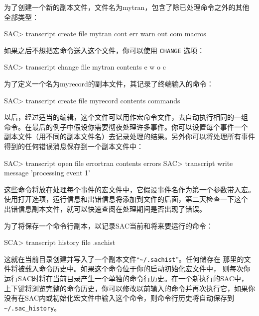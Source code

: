 为了创建一个新的副本文件，文件名为mytran，包含了除已处理命令之外的其他
全部类型：
\begin{SACCode}
SAC> transcript create file mytran cont err warn out com macros
\end{SACCode}

如果之后不想把宏命令送入这个文件，你可以使用 \texttt{CHANGE} 选项：
\begin{SACCode}
SAC> transcript change file mytran contents e w o c
\end{SACCode}

为了定义一个名为myrecord的副本文件，其记录了终端输入的命令：
\begin{SACCode}
SAC> transcript create file myrecord contents commands
\end{SACCode}

以后，经过适当的编辑，这个文件可以用作宏命令文件，去自动执行相同的一组
命令。在最后的例子中假设你需要彻夜处理许多事件。你可以设置每个事件一个
副本文件（用不同的副本文件名）去记录处理的结果。另外你可以将处理所有事件
得到的任何错误消息保存到一个副本文件中：
\begin{SACCode}
SAC> transcript open file errortran contents errors
SAC> transcript write message 'processing event 1'
\end{SACCode}

这些命令将放在处理每个事件的宏文件中，它假设事件名作为第一个参数带入宏。
使用打开选项，运行信息和出错信息将添加到文件的后面，第二天检查一下这个
出错信息副本文件，就可以快速查阅在处理期间是否出现了错误。

为了将保存一个命令行副本，以记录SAC当前和将来要运行的命令：
\begin{SACCode}
SCA> transcript history file .sachist
\end{SACCode}
这就在当前目录创建并写入了一个副本文件``\verb|~/.sachist|''。任何储存在
那里的文件将被载入命令历史中。如果这个命令位于你的启动初始化宏文件中，
则每次你运行SAC时将在当前目录产生一个单独的命令行历史。在一个新执行的SAC中，
上下键将浏览完整的命令历史，你可以修改以前输入的命令并再次执行它，如果你
没有在SAC内或初始化宏文件中输入这个命令，则命令行历史将自动保存到
\verb|~/.sac_history|。
